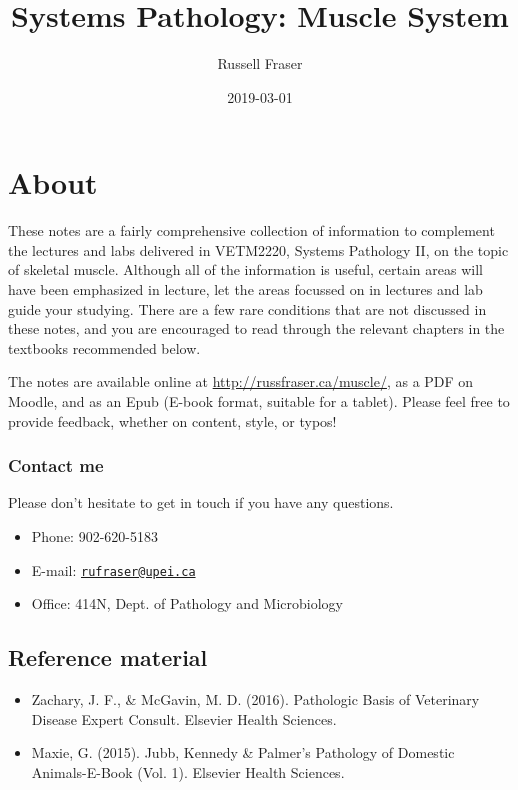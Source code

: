 \documentclass[openany]{book}
\title{Systems Pathology: Muscle System}
\author{Russell Fraser}
\date{2019-03-01}
\providecommand{\tightlist}{%
  \setlength{\itemsep}{0pt}\setlength{\parskip}{0pt}}
\begin{document}
\maketitle

{
\setcounter{tocdepth}{1}
\tableofcontents
}
\chapter*{About}\label{about}

These notes are a fairly comprehensive collection of information to
complement the lectures and labs delivered in VETM2220, Systems
Pathology II, on the topic of skeletal muscle. Although all of the
information is useful, certain areas will have been emphasized in
lecture, let the areas focussed on in lectures and lab guide your
studying. There are a few rare conditions that are not discussed in
these notes, and you are encouraged to read through the relevant
chapters in the textbooks recommended below.

The notes are available online at \url{http://russfraser.ca/muscle/}, as
a PDF on Moodle, and as an Epub (E-book format, suitable for a tablet).
Please feel free to provide feedback, whether on content, style, or
typos!

\subsection*{Contact me}\label{contact-me}

Please don't hesitate to get in touch if you have any questions.

\begin{itemize}
\tightlist
\item
  Phone: 902-620-5183
\item
  E-mail: \href{mailto:rufraser@upei.ca}{\nolinkurl{rufraser@upei.ca}}
\item
  Office: 414N, Dept. of Pathology and Microbiology
\end{itemize}

\section*{Reference material}\label{reference-material}

\begin{itemize}
\tightlist
\item
  Zachary, J. F., \& McGavin, M. D. (2016). Pathologic Basis of
  Veterinary Disease Expert Consult. Elsevier Health Sciences.
\item
  Maxie, G. (2015). Jubb, Kennedy \& Palmer's Pathology of Domestic
  Animals-E-Book (Vol. 1). Elsevier Health Sciences.
\end{itemize}
\end{document}
